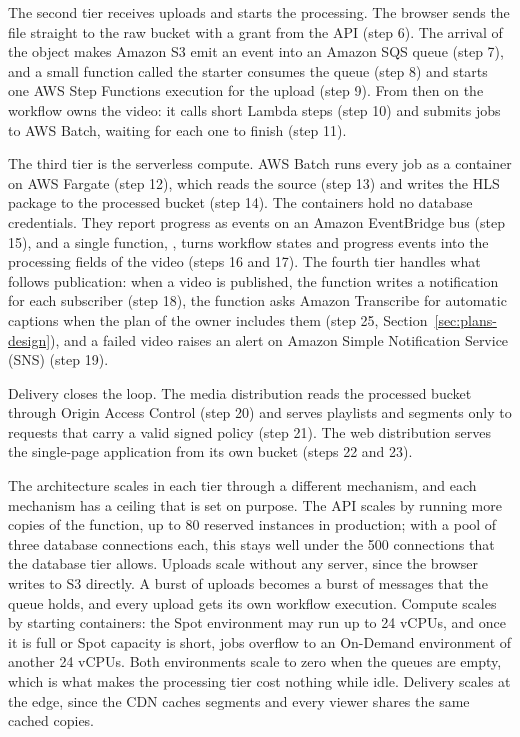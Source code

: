 The second tier receives uploads and starts the processing. The browser sends the file straight to
the raw bucket with a grant from the API (step 6). The arrival of the object makes Amazon S3 emit an
event into an Amazon SQS queue (step 7), and a small function called the starter consumes the queue
(step 8) and starts one AWS Step Functions execution for the upload (step 9). From then on the
workflow owns the video: it calls short Lambda steps (step 10) and submits jobs to AWS Batch, waiting
for each one to finish (step 11).

The third tier is the serverless compute. AWS Batch runs every job as a container on AWS Fargate
(step 12), which reads the source (step 13) and writes the HLS package to the processed bucket
(step 14). The containers hold no database credentials. They report progress as events on an Amazon
EventBridge bus (step 15), and a single function, , turns workflow states and progress
events into the processing fields of the video (steps 16 and 17). The fourth tier handles what
follows publication: when a video is published, the  function writes a notification
for each subscriber (step 18), the  function asks Amazon Transcribe for automatic
captions when the plan of the owner includes them (step 25, Section~\ref{sec:plans-design}), and a failed
video raises an alert on Amazon Simple Notification Service (SNS) (step 19).

Delivery closes the loop. The media distribution reads the processed bucket through Origin Access
Control (step 20) and serves playlists and segments only to requests that carry a valid signed policy
(step 21). The web distribution serves the single-page application from its own bucket (steps 22
and 23).

The architecture scales in each tier through a different mechanism, and each mechanism has a
ceiling that is set on purpose. The API scales by running more copies of the function, up to 80
reserved instances in production; with a pool of three database connections each, this stays well
under the 500 connections that the database tier allows. Uploads scale without any server, since
the browser writes to S3 directly. A burst of uploads becomes a burst of messages that the queue
holds, and every upload gets its own workflow execution. Compute scales by starting containers: the
Spot environment may run up to 24 vCPUs, and once it is full or Spot capacity is short, jobs overflow
to an On-Demand environment of another 24 vCPUs. Both environments scale to zero when the queues are
empty, which is what makes the processing tier cost nothing while idle. Delivery scales at the edge, since
the CDN caches segments and every viewer shares the same cached copies.

